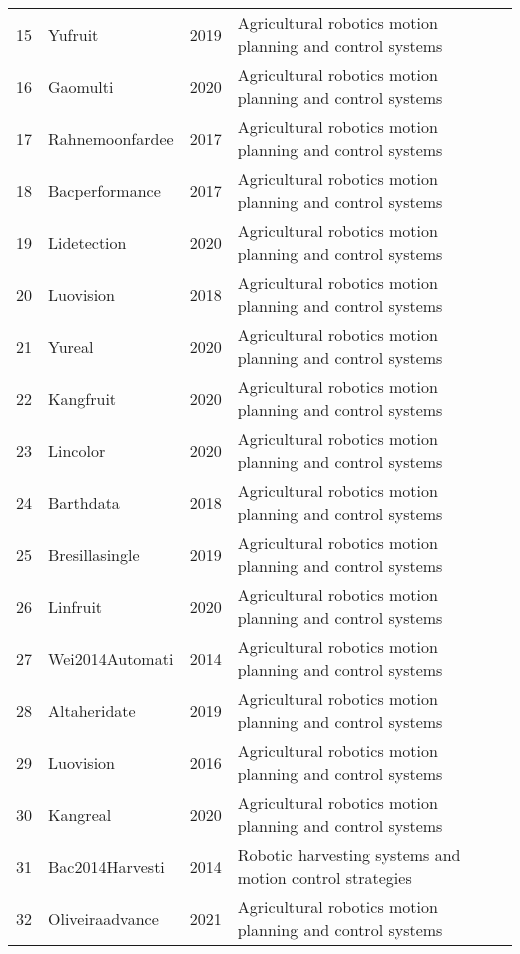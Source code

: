 \begin{table*}[htbp]
\begin{tabular}{p{}p{}p{}p{}p{}}
15 & Yufruit & 2019 & Agricultural robotics motion planning and control systems & \cite{yu2019fruit} \\
16 & Gaomulti & 2020 & Agricultural robotics motion planning and control systems & \cite{gao2020multi} \\
17 & Rahnemoonfardee & 2017 & Agricultural robotics motion planning and control systems & \cite{rahnemoonfar2017deep} \\
18 & Bacperformance & 2017 & Agricultural robotics motion planning and control systems & \cite{bac2017performance} \\
19 & Lidetection & 2020 & Agricultural robotics motion planning and control systems & \cite{li2020detection} \\
20 & Luovision & 2018 & Agricultural robotics motion planning and control systems & \cite{luo2018vision} \\
21 & Yureal & 2020 & Agricultural robotics motion planning and control systems & \cite{yu2020real} \\
22 & Kangfruit & 2020 & Agricultural robotics motion planning and control systems & \cite{kang2020fruit} \\
23 & Lincolor & 2020 & Agricultural robotics motion planning and control systems & \cite{lin2020color} \\
24 & Barthdata & 2018 & Agricultural robotics motion planning and control systems & \cite{barth2018data} \\
25 & Bresillasingle & 2019 & Agricultural robotics motion planning and control systems & \cite{bresilla2019single} \\
26 & Linfruit & 2020 & Agricultural robotics motion planning and control systems & \cite{lin2020fruit} \\
27 & Wei2014Automati & 2014 & Agricultural robotics motion planning and control systems & \cite{wei2014automatic} \\
28 & Altaheridate & 2019 & Agricultural robotics motion planning and control systems & \cite{altaheri2019date} \\
29 & Luovision & 2016 & Agricultural robotics motion planning and control systems & \cite{luo2016vision} \\
30 & Kangreal & 2020 & Agricultural robotics motion planning and control systems & \cite{kang2020real} \\
31 & Bac2014Harvesti & 2014 & Robotic harvesting systems and motion control strategies & \cite{bac2014harvesting} \\
32 & Oliveiraadvance & 2021 & Agricultural robotics motion planning and control systems & \cite{oliveira2021advances} \\

\end{tabular}
\end{table*}
